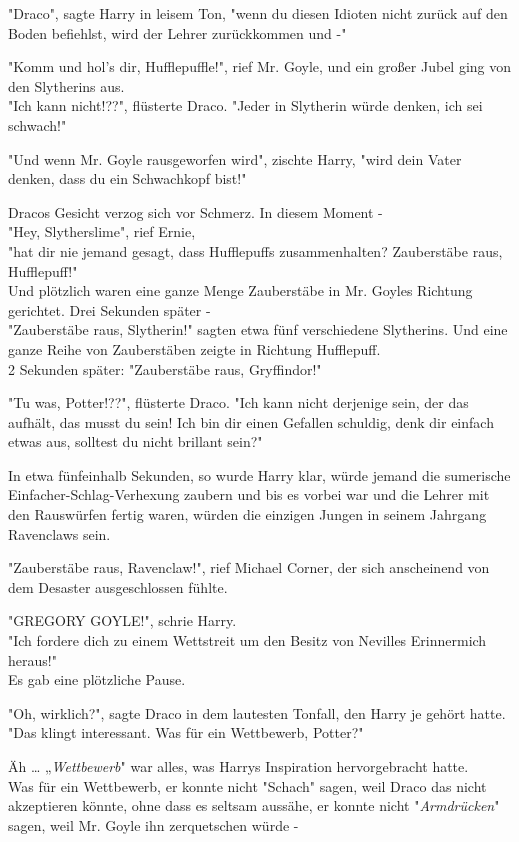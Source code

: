 {"Draco", sagte Harry in leisem Ton, "wenn du diesen Idioten nicht zurück auf den Boden befiehlst, wird der Lehrer zurückkommen und -"

"Komm und hol's dir, Hufflepuffle!", rief Mr. Goyle, und ein großer Jubel ging von den Slytherins aus.\\ "Ich kann nicht!??", flüsterte Draco. "Jeder in Slytherin würde denken, ich sei schwach!"

"Und wenn Mr. Goyle rausgeworfen wird", zischte Harry, "wird dein Vater denken, dass du ein Schwachkopf bist!"

Dracos Gesicht verzog sich vor Schmerz. In diesem Moment -\\ "Hey, Slytherslime", rief Ernie,\\ "hat dir nie jemand gesagt, dass Hufflepuffs zusammenhalten? Zauberstäbe raus, Hufflepuff!"\\ Und plötzlich waren eine ganze Menge Zauberstäbe in Mr. Goyles Richtung gerichtet. Drei Sekunden später -\\ "Zauberstäbe raus, Slytherin!" sagten etwa fünf verschiedene Slytherins. Und eine ganze Reihe von Zauberstäben zeigte in Richtung Hufflepuff.\\ 2 Sekunden später: "Zauberstäbe raus, Gryffindor!"

"Tu was, Potter!??", flüsterte Draco. "Ich kann nicht derjenige sein, der das aufhält, das musst du sein! Ich bin dir einen Gefallen schuldig, denk dir einfach etwas aus, solltest du nicht brillant sein?"

In etwa fünfeinhalb Sekunden, so wurde Harry klar, würde jemand die sumerische Einfacher-Schlag-Verhexung zaubern und bis es vorbei war und die Lehrer mit den Rauswürfen fertig waren, würden die einzigen Jungen in seinem Jahrgang Ravenclaws sein.

"Zauberstäbe raus, Ravenclaw!", rief Michael Corner, der sich anscheinend von dem Desaster ausgeschlossen fühlte.

"GREGORY GOYLE!", schrie Harry.\\ "Ich fordere dich zu einem Wettstreit um den Besitz von Nevilles Erinnermich heraus!"\\ Es gab eine plötzliche Pause.

"Oh, wirklich?", sagte Draco in dem lautesten Tonfall, den Harry je gehört hatte. "Das klingt interessant. Was für ein Wettbewerb, Potter?"

Äh … „\emph{Wettbewerb}" war alles, was Harrys Inspiration hervorgebracht hatte.\\ Was für ein Wettbewerb, er konnte nicht "Schach" sagen, weil Draco das nicht akzeptieren könnte, ohne dass es seltsam aussähe, er konnte nicht "\emph{Armdrücken}" sagen, weil Mr. Goyle ihn zerquetschen würde -

}
